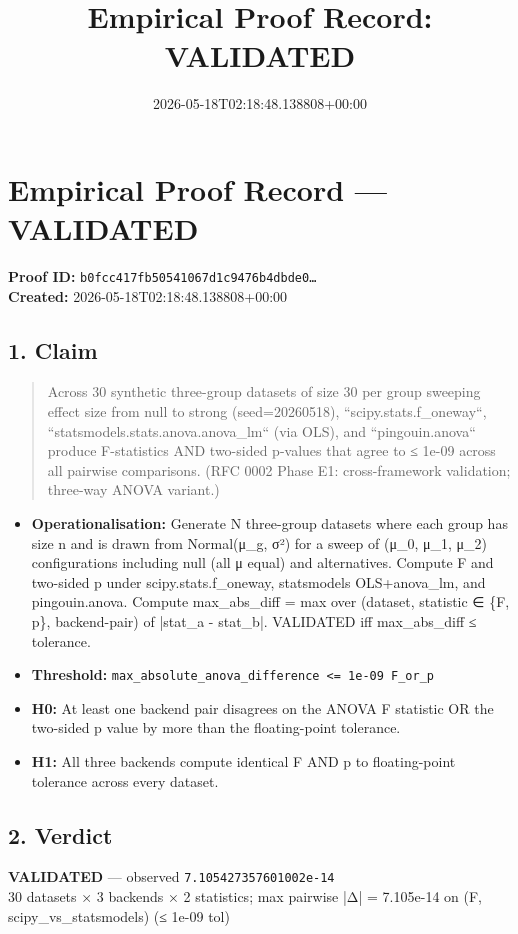 \documentclass{article}
\title{Empirical Proof Record: VALIDATED}
\date{2026-05-18T02:18:48.138808+00:00}
\begin{document}
\maketitle
\section*{Empirical Proof Record --- \textcolor{validated}{\textbf{VALIDATED}}}
\textbf{Proof ID:} \texttt{b0fcc417fb50541067d1c9476b4dbde0\dots}\\
\textbf{Created:} 2026-05-18T02:18:48.138808+00:00
\subsection*{1. Claim}
\begin{quote}Across 30 synthetic three-group datasets of size 30 per group sweeping effect size from null to strong (seed=20260518), ``scipy.stats.f\_oneway``, ``statsmodels.stats.anova.anova\_lm`` (via OLS), and ``pingouin.anova`` produce F-statistics AND two-sided p-values that agree to ≤ 1e-09 across all pairwise comparisons. (RFC 0002 Phase E1: cross-framework validation; three-way ANOVA variant.)\end{quote}
\begin{itemize}
\item \textbf{Operationalisation:} Generate N three-group datasets where each group has size n and is drawn from Normal(μ\_g, σ²) for a sweep of (μ\_0, μ\_1, μ\_2) configurations including null (all μ equal) and alternatives. Compute F and two-sided p under scipy.stats.f\_oneway, statsmodels OLS+anova\_lm, and pingouin.anova. Compute max\_abs\_diff = max over (dataset, statistic ∈ \{F, p\}, backend-pair) of |stat\_a - stat\_b|. VALIDATED iff max\_abs\_diff ≤ tolerance.
\item \textbf{Threshold:} \texttt{max\_absolute\_anova\_difference <= 1e-09 F\_or\_p}
\item \textbf{H0:} At least one backend pair disagrees on the ANOVA F statistic OR the two-sided p value by more than the floating-point tolerance.
\item \textbf{H1:} All three backends compute identical F AND p to floating-point tolerance across every dataset.
\end{itemize}
\subsection*{2. Verdict}
\textcolor{validated}{\textbf{VALIDATED}} --- observed \texttt{7.105427357601002e-14}\\
30 datasets × 3 backends × 2 statistics; max pairwise |Δ| = 7.105e-14 on (F, scipy\_vs\_statsmodels) (≤ 1e-09 tol)
\end{document}
